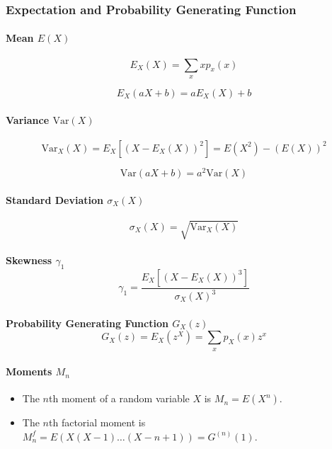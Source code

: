 \documentclass[twocolumn,english]{article}
\begin{document}
\subsubsection{Expectation and Probability Generating Function}

\paragraph{Mean $E\left(X\right)$}

\[
E_{X}\left(X\right)=\sum_{x}xp_{x}\left(x\right)
\]

\[
E_{X}\left(aX+b\right)=aE_{X}\left(X\right)+b
\]

\paragraph{Variance $\text{Var}\left(X\right)$}

\[
\text{Var}_{X}\left(X\right)=E_{X}\left[\left(X-E_{X}\left(X\right)\right)^{2}\right]=E\left(X^{2}\right)-\left(E\left(X\right)\right)^{2}
\]

\[
\text{Var}\left(aX+b\right)=a^{2}\text{Var}\left(X\right)
\]

\paragraph{Standard Deviation $\sigma_{X}\left(X\right)$}

\[
\sigma_{X}\left(X\right)=\sqrt{\text{Var}_{X}\left(X\right)}
\]

\paragraph{Skewness $\gamma_{1}$
\[
\gamma_{1}=\frac{E_{X}\left[\left(X-E_{X}\left(X\right)\right)^{3}\right]}{\sigma_{X}\left(X\right)^{3}}
\]
}

\paragraph{Probability Generating Function $G_{X}\left(z\right)$
\[
G_{X}\left(z\right)=E_{X}\left(z^{X}\right)=\sum_{x}p_{X}\left(x\right)z^{x}
\]
}

\paragraph{Moments $M_{n}$}
\begin{itemize}
\item The $n$th moment of a random variable $X$ is $M_{n}=E\left(X^{n}\right)$.
\item The $n$th factorial moment is $M_{n}^{f}=E\left(X\left(X-1\right)\dots\left(X-n+1\right)\right)=G^{(n)}\left(1\right)$.
\end{itemize}
\end{document}
